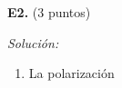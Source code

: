 \textbf{E2.} (3 puntos)


\vspace{20px}
\textit{Solución:}
\\

\begin{enumerate}
[label=\alph*)]
    \item La polarización
\end{enumerate}